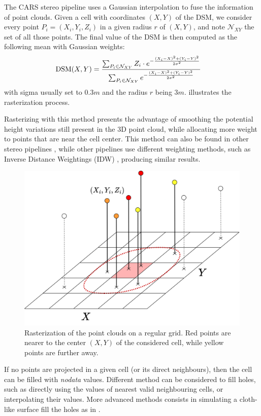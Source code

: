 The CARS stereo pipeline uses a Gaussian interpolation to fuse the information of point clouds. Given a cell with coordinates $(X,Y)$ of the DSM, we consider every point $P_i=(X_i, Y_i, Z_i)$ in a given radius $r$ of $(X,Y)$, and note $\mathcal{N}_{XY}$ the set of all those points. The final value of the DSM is then computed as the following mean with Gaussian weights:
\begin{align}
    \mathrm{DSM}(X,Y) &= \frac{\sum_{P_i\in\mathcal{N}_{XY}}Z_i\cdot e^{-\frac{(X_i-X)^2+(Y_i-Y)^2}{2\sigma^2}}}{\sum_{P_i\in\mathcal{N}_{XY}} e^{-\frac{(X_i-X)^2+(Y_i-Y)^2}{2\sigma^2}}}
\end{align}
with sigma usually set to $0.3m$ and the radius $r$ being $3m$.  illustrates the rasterization process.

Rasterizing with this method presents the advantage of smoothing the potential height variations still present in the 3D point cloud, while allocating more weight to points that are near the cell center. This method can also be found in other stereo pipelines \cite{shean_automated_2016}, while other pipelines use different weighting methods, such as Inverse Distance Weightings (IDW) \cite{rupnik_micmac_2017}, producing similar results.

\begin{figure}
    \centering
    \includegraphics[width=0.7\linewidth]{Images/Chap_1/Rasterization.png}
    \caption{Rasterization of the point clouds on a regular grid. Red points are nearer to the center $(X,Y)$ of the considered cell, while yellow points are further away.}
    \label{fig:rasterization}
\end{figure}

\begin{remark}
    If no points are projected in a given cell (or its direct neighbours), then the cell can be filled with \textit{nodata} values. Different method can be considered to fill holes, such as directly using the values of nearest valid neighbouring cells, or interpolating their values. More advanced methods consists in simulating a cloth-like surface fill the holes as in \cite{lallement_bulldozer_2022}.
\end{remark}

